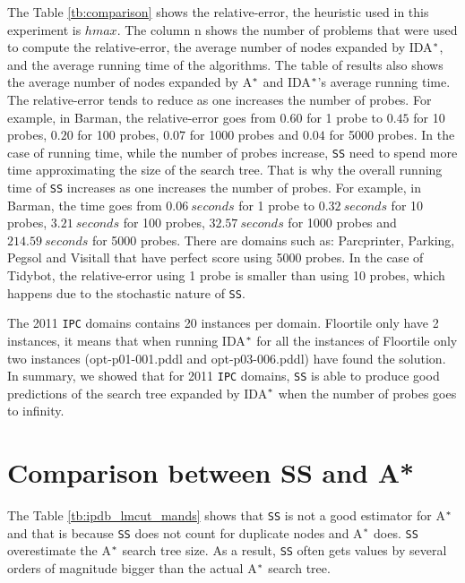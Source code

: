 The Table \ref{tb:comparison} shows the relative-error, the heuristic used in this experiment is $hmax$. The column \textsf{n} shows the number of problems that were used to compute the relative-error, the average number of nodes expanded by IDA$\sp{*}$, and the average running time of the algorithms. The table of results also shows the average number of nodes expanded by A$\sp{*}$ and IDA$\sp{*}$'s average running time. The relative-error tends to reduce as one increases the number of probes. For example, in Barman, the relative-error goes from $0.60$ for 1 probe to $0.45$ for 10 probes, $0.20$ for 100 probes, $0.07$ for 1000 probes and $0.04$ for 5000 probes. In the case of running time, while the number of probes increase, \texttt{SS} need to spend more time approximating the size of the search tree. That is why the overall running time of \texttt{SS} increases as one increases the number of probes. For example, in Barman, the time goes from $0.06\ seconds$ for 1 probe to $0.32\ seconds$ for 10 probes, $3.21\ seconds$ for 100 probes, $32.57\ seconds$ for 1000 probes and $214.59\ seconds$ for 5000 probes. There are domains such as: Parcprinter, Parking, Pegsol and Visitall that have perfect score using 5000 probes. In the case of Tidybot, the relative-error using 1 probe is smaller than using 10 probes, which happens due to the stochastic nature of \texttt{SS}.

The 2011 \texttt{IPC} domains contains 20 instances per domain. Floortile only have 2 instances, it means that when running IDA$\sp{*}$ for all the instances of Floortile only two instances (opt-p01-001.pddl and opt-p03-006.pddl) have found the solution. In summary, we showed that for 2011 \texttt{IPC} domains, \texttt{SS} is able to produce good predictions of the search tree expanded by IDA$\sp{*}$ when the number of probes goes to infinity.

\section{Comparison between SS and A*}
\noindent
The Table \ref{tb:ipdb_lmcut_mands} shows that \texttt{SS} is not a good estimator for A$\sp{*}$ and that is because \texttt{SS} does not count for duplicate nodes and A$\sp{*}$ does. \texttt{SS} overestimate the A$\sp{*}$ search tree size. As a result, \texttt{SS} often gets values by several orders of magnitude bigger than the actual A$\sp{*}$ search tree.

